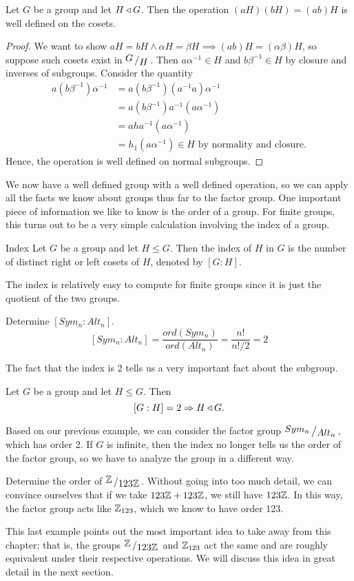 \begin{theorem}{}
	Let $G$ be a group and let $H\triangleleft G$. Then the operation $(aH)(bH)=(ab)H$ is well defined on the cosets.
\end{theorem}
\begin{proof}
	We want to show $aH=bH\land \alpha H=\beta H\implies (ab)H=(\alpha\beta)H$, so suppose such cosets exist in $\fgroup{G}{H}$.
	Then $a\alpha^{-1}\in H$ and $b\beta^{-1}\in H$ by closure and inverses of subgroups. Consider the quantity
	\begin{align*}
		a(b\beta^{-1})\alpha^{-1} &= a(b\beta^{-1})(a^{-1}a)\alpha^{-1}\\
		&= a(b\beta^{-1})a^{-1}(a\alpha^{-1})\\
		&= aha^{-1}(a\alpha^{-1})\\
		&= h_{1}(a\alpha^{-1})\in H\text{ by normality and closure.}
	\end{align*}
	Hence, the operation is well defined on normal subgroups.
\end{proof}

We now have a well defined group with a well defined operation, so we can apply all the facts we know about groups thus far to the factor group.
One important piece of information we like to know is the order of a group.
For finite groups, this turns out to be a very simple calculation involving the index of a group.
\begin{definition}{Index}
	Let $G$ be a group and let $H\leq G$. Then the index of $H$ in $G$ is the number of distinct right or left cosets of $H$, denoted by $[G:H]$.
\end{definition}
The index is relatively easy to compute for finite groups since it is just the quotient of the two groups.
\begin{example}{Determine $[Sym_{n}:Alt_{n}]$.}
\[
	[Sym_{n}:Alt_{n}]=\frac{ord(Sym_{n})}{ord(Alt_{n})}=\frac{n!}{n!/2}=2
\]
\end{example}
The fact that the index is 2 tells us a very important fact about the subgroup.
\begin{theorem}{}
	Let $G$ be a group and let $H\leq G$. Then
	\[
		[G:H]=2\Rightarrow H\triangleleft G.
	\]
\end{theorem}
Based on our previous example, we can consider the factor group $\fgroup{Sym_{n}}{Alt_{n}}$, which has order 2.
If $G$ is infinite, then the index no longer tells us the order of the factor group, so we have to analyze the group in a different way.
\begin{example}{Determine the order of $\fgroup{\ZZ}{123\ZZ}$.}
	Without going into too much detail, we can convince ourselves that if we take $123\mathbb{Z}+123\mathbb{Z}$, we still have $123\mathbb{Z}$. In this way, the factor group acts like $\mathbb{Z}_{123}$, which we know to have order 123.
\end{example}

This last example points out the most important idea to take away from this chapter; that is, the groups $\fgroup{\ZZ}{123\ZZ}$ and $\mathbb{Z}_{123}$ act the same and are roughly equivalent under their respective operations.
We will discuss this idea in great detail in the next section.
